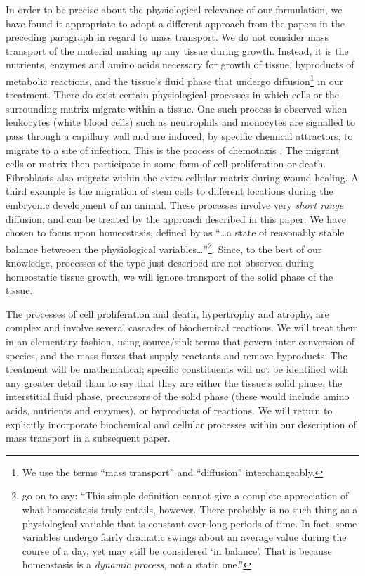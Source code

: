 In order to be precise about the physiological relevance of our
formulation, we have found it appropriate to adopt a different
approach from the papers in the preceding paragraph in regard to
mass transport. We do not consider mass transport of the material
making up any tissue during growth. Instead, it is the nutrients,
enzymes and amino acids necessary for growth of tissue, byproducts
of metabolic reactions, and the tissue's fluid phase
\citep{Swartzetal:99} that undergo diffusion\footnote{We use the
terms ``mass transport'' and ``diffusion'' interchangeably.} in
our treatment. There do exist certain physiological processes in
which cells or the surrounding matrix migrate within a tissue. One
such process is observed when leukocytes (white blood cells) such
as neutrophils and monocytes are signalled to pass through a
capillary wall and are induced, by specific chemical attractors,
to migrate to a site of infection. This is the process of
chemotaxis \citep{GuytonHall:1996,Vander:2003}. The migrant cells
or matrix then participate in some form of cell proliferation or
death. Fibroblasts also migrate within the extra cellular matrix
during wound healing. A third example is the migration of stem
cells to different locations during the embryonic development of
an animal. These processes involve very \emph{short range}
diffusion, and can be treated by the approach described in this
paper. We have chosen to focus upon homeostasis, defined by
\citet{Vander:2003} as ``\dots a state of reasonably stable
balance betweoen the physiological
variables\dots''\footnote{\citet{Vander:2003} go on to say: ``This
simple definition cannot give a complete appreciation of what
homeostasis truly entails, however. There probably is no such
thing as a physiological variable that is constant over long
periods of time. In fact, some variables undergo fairly dramatic
swings about an average value during the course of a day, yet may
still be considered `in balance'. That is because homeostasis is a
\emph{dynamic process}, not a static one.''}. Since, to the best
of our knowledge, processes of the type just described are not
observed during homeostatic tissue growth, we will ignore
transport of the solid phase of the tissue.

The processes of cell proliferation and death, hypertrophy and
atrophy, are complex and involve several cascades of biochemical
reactions. We will treat them in an elementary fashion, using
source/sink terms that govern inter-conversion of species, and the
mass fluxes that supply reactants and remove byproducts. The
treatment will be mathematical; specific constituents will not be
identified with any greater detail than to say that they are
either the tissue's solid phase, the interstitial fluid phase,
precursors of the solid phase (these would include amino acids,
nutrients and enzymes), or byproducts of reactions. We will return
to explicitly incorporate biochemical and cellular processes
within our description of mass transport in a subsequent paper.

